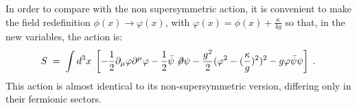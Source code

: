 \documentclass[a4paper,12pt]{article}
\begin{document}
In order to compare with the non supersymmetric action, it is convenient to
make the field redefinition $\phi (x) \to \varphi(x)$, with 
\mbox{$\varphi (x) = \phi(x) + \frac{\kappa}{4g}$}  
so that, in the new variables, the action is:
\begin{equation}
S\;=\;\int d^3x \; \left[-\frac{1}{2} \partial_\mu \varphi \partial^\mu \varphi 
- \frac{1}{2} {\bar\psi} \not \! \partial \psi - \frac{g^2}{2} 
( \varphi^2 - (\frac{\kappa}{g})^2 )^2 
- g \varphi {\bar \psi} \psi \right] \;.
\end{equation}
This action is almost identical to its non-supersymmetric version, differing
only in their fermionic sectors. 

\end{document}

